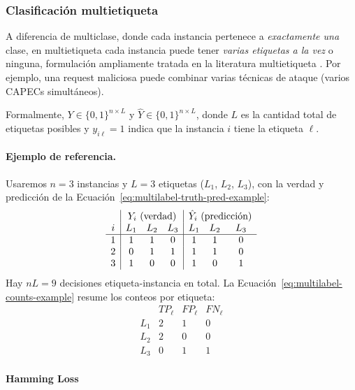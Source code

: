 \documentclass[12pt,oneside]{report}
\begin{document}
\subsubsection{Clasificación multietiqueta}

A diferencia de multiclase, donde cada instancia pertenece a
\emph{exactamente una} clase, en multietiqueta cada instancia puede
tener \emph{varias etiquetas a la vez} o ninguna, formulación ampliamente tratada en la literatura multietiqueta \cite{tsoumakas_multilabel_overview,read2011}. Por ejemplo, una
request maliciosa puede combinar varias técnicas de ataque (varios
CAPECs simultáneos).

Formalmente, $Y\in\{0,1\}^{n\times L}$ y $\hat{Y}\in\{0,1\}^{n\times L}$,
donde $L$ es la cantidad total de etiquetas posibles y $y_{i\ell}=1$
indica que la instancia $i$ tiene la etiqueta $\ell$.

\paragraph{Ejemplo de referencia.} Usaremos $n=3$ instancias y $L=3$
etiquetas ($L_1$, $L_2$, $L_3$), con la verdad y predicción de la Ecuación~\eqref{eq:multilabel-truth-pred-example}:
\begin{equation}
\label{eq:multilabel-truth-pred-example}
\begin{array}{c|ccc|ccc}
 & \multicolumn{3}{c|}{Y_i\ \text{(verdad)}} & \multicolumn{3}{c}{\hat Y_i\ \text{(predicción)}} \\
i & L_1 & L_2 & L_3 & L_1 & L_2 & L_3 \\
\hline
1 & 1 & 1 & 0 & 1 & 1 & 0 \\
2 & 0 & 1 & 1 & 1 & 1 & 0 \\
3 & 1 & 0 & 0 & 1 & 0 & 1
\end{array}
\end{equation}
Hay $nL=9$ decisiones etiqueta-instancia en total. La Ecuación~\eqref{eq:multilabel-counts-example} resume los conteos por etiqueta:
\begin{equation}
\label{eq:multilabel-counts-example}
\begin{array}{l|ccc}
 & TP_\ell & FP_\ell & FN_\ell \\
\hline
L_1 & 2 & 1 & 0 \\
L_2 & 2 & 0 & 0 \\
L_3 & 0 & 1 & 1
\end{array}
\end{equation}

\paragraph{Hamming Loss}
\end{document}
